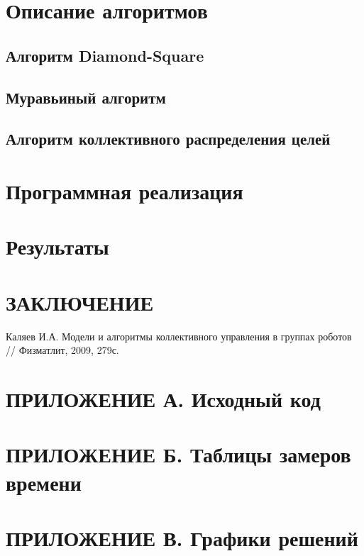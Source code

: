 \documentclass{article}
\begin{document}
	\newpage
    \section{Описание алгоритмов}

    \subsection{Алгоритм Diamond-Square}

    \subsection{Муравьиный алгоритм}

    \subsection{Алгоритм коллективного распределения целей}

    \newpage
    \section{Программная реализация}

	\newpage
    \section{Результаты}

    \newpage
    \section*{ЗАКЛЮЧЕНИЕ}

    \newpage
	\renewcommand\refname{ЛИТЕРАТУРА}
	\begin{thebibliography}{}
		 Каляев И.А. Модели и алгоритмы коллективного управления в группах роботов // Физматлит, 2009, 279с.
	\end{thebibliography}


    \newpage
    \section*{ПРИЛОЖЕНИЕ А. Исходный код}

    \newpage
    \section*{ПРИЛОЖЕНИЕ Б. Таблицы замеров времени}

    \newpage
    \section*{ПРИЛОЖЕНИЕ В. Графики решений}
\end{document}
